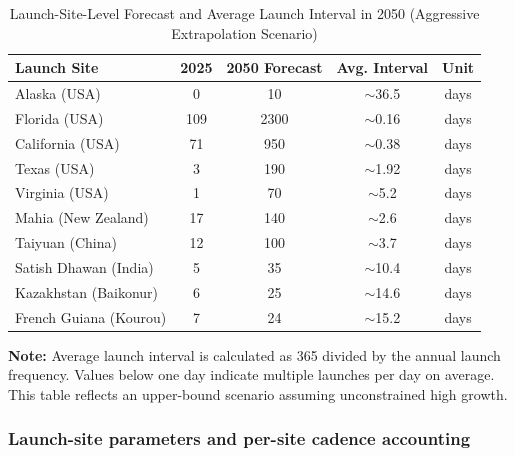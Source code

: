 ﻿\documentclass{mcmthesis}
\begin{document}
\begin{table}[htbp]
\centering
\caption{Launch-Site-Level Forecast and Average Launch Interval in 2050 (Aggressive Extrapolation Scenario)}
\label{tab:launch_forecast_interval_2050}
\begin{tabular}{lcccc}
\hline
\textbf{Launch Site} & \textbf{2025} & \textbf{2050 Forecast} & \textbf{Avg. Interval} & \textbf{Unit} \\
\hline
Alaska (USA) & 0 & 10 & $\sim$36.5 & days \\
Florida (USA) & 109 & 2300 & $\sim$0.16 & days \\
California (USA) & 71 & 950 & $\sim$0.38 & days \\
Texas (USA) & 3 & 190 & $\sim$1.92 & days \\
Virginia (USA) & 1 & 70 & $\sim$5.2 & days \\
Mahia (New Zealand) & 17 & 140 & $\sim$2.6 & days \\
Taiyuan (China) & 12 & 100 & $\sim$3.7 & days \\
Satish Dhawan (India) & 5 & 35 & $\sim$10.4 & days \\
Kazakhstan (Baikonur) & 6 & 25 & $\sim$14.6 & days \\
French Guiana (Kourou) & 7 & 24 & $\sim$15.2 & days \\
\hline
\end{tabular}

\vspace{0.5em}
\footnotesize
\textbf{Note:} Average launch interval is calculated as 365 divided by the annual launch frequency.
Values below one day indicate multiple launches per day on average.
This table reflects an upper-bound scenario assuming unconstrained high growth.
\end{table}

\subsubsection{Launch-site parameters and per-site cadence accounting}
\label{sec:launch_site_params}
\end{document}
